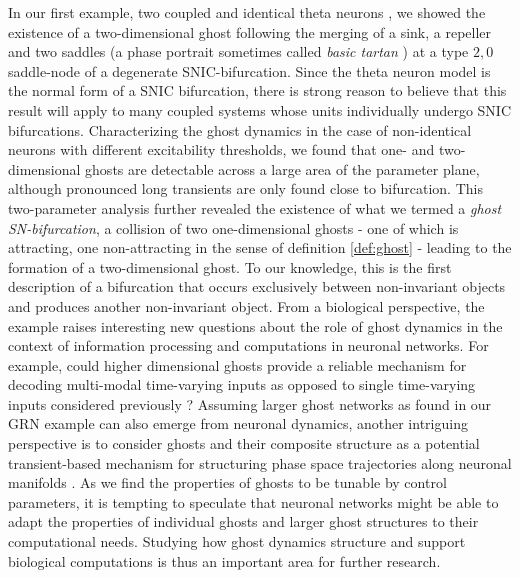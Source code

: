 \documentclass{article}
\theoremstyle{definition}
\begin{document}
\begin{refsection}
In our first example, two coupled and identical theta neurons \cite{Augustsson2024}, we showed the existence of a two-dimensional ghost following the merging of a sink, a repeller and two saddles (a phase portrait sometimes called \emph{basic tartan} \cite{Baesens2013}) at a type $2,0$ saddle-node of a degenerate SNIC-bifurcation. Since the theta neuron model is the normal form of a SNIC bifurcation, there is strong reason to believe that this result will apply to many coupled systems whose units individually undergo SNIC bifurcations. Characterizing the ghost dynamics in the case of non-identical neurons with different excitability thresholds, we found that one- and two-dimensional ghosts are detectable across a large area of the parameter plane, although pronounced long transients are only found close to bifurcation. This two-parameter analysis further revealed the existence of what we termed a \textit{ghost SN-bifurcation}, a collision of two one-dimensional ghosts - one of which is attracting, one non-attracting in the sense of definition \ref{def:ghost} - leading to the formation of a two-dimensional ghost. To our knowledge, this is the first description of a bifurcation that occurs exclusively between non-invariant objects and produces another non-invariant object. From a biological perspective, the example raises interesting new questions about the role of ghost dynamics in the context of information processing and computations in neuronal networks. For example, could higher dimensional ghosts provide a reliable mechanism for decoding multi-modal time-varying inputs as opposed to single time-varying inputs considered previously \cite{Choi_2024}? Assuming larger ghost networks as found in our GRN example can also emerge from neuronal dynamics, another intriguing perspective is to consider ghosts and their composite structure as a potential transient-based mechanism for structuring phase space trajectories along neuronal manifolds \cite{Perich2025}. As we find the properties of ghosts to be tunable by control parameters, it is tempting to speculate that neuronal networks might be able to adapt the properties of individual ghosts and larger ghost structures to their computational needs. Studying how ghost dynamics structure and support biological computations is thus an important area for further research.


\end{refsection}
\end{document}
